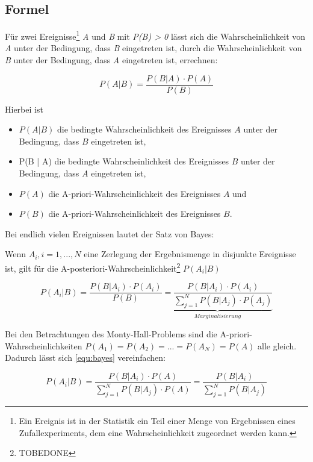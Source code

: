 \subsection{Formel}

Für zwei Ereignisse\footnote{Ein Ereignis ist in der Statistik ein Teil einer Menge von Ergebnissen eines Zufallexperiments, dem eine Wahrscheinlichkeit zugeordnet
    werden kann.} \textit{A} und \textit{B} mit \textit{P(B) > 0} lässt sich die Wahrscheinlichkeit von \textit{A} unter der Bedingung, dass \textit{B} eingetreten
ist, durch die Wahrscheinlichkeit von \textit{B} unter der Bedingung, dass \textit{A} eingetreten ist, errechnen:

\begin{equation}
    P(A | B) = \frac{P(B | A) \cdot P(A)}{P(B)}
\end{equation}

Hierbei ist

\begin{itemize}
    \item $P(A | B)$ die bedingte Wahrscheinlichkeit des Ereignisses $A$ unter der Bedingung, dass $B$ eingetreten ist,
    \item P(B | A) die bedingte Wahrscheinlichkeit des Ereignisses $B$ unter der Bedingung, dass $A$ eingetreten ist,
    \item $P(A)$ die A-priori-Wahrscheinlichkeit des Ereignisses $A$ und
    \item $P(B)$ die A-priori-Wahrscheinlichkeit des Ereignisses $B$.
\end{itemize}

Bei endlich vielen Ereignissen lautet der Satz von Bayes:

Wenn $A_i, i = 1,..., N$ eine Zerlegung der Ergebnismenge in disjunkte Ereignisse ist, gilt für die A-posteriori-Wahrscheinlichkeit\footnote{TOBEDONE}
$P(A_i | B)$

\begin{equation} \label{equ:bayes}
    P(A_i | B) = \frac{P(B | A_i) \cdot P(A_i)}{P(B)} \underbrace{= \frac{P(B | A_i) \cdot P(A_i)}{\sum_{j = 1}^{N} P(B | A_j) \cdot P(A_j)}}_{Marginalisierung}
\end{equation}

\cite[S.411f]{Papula:2014}

Bei den Betrachtungen des Monty-Hall-Problems sind die A-priori-Wahrscheinlichkeiten $P(A_1) = P(A_2) = ... = P(A_N) = P(A)$ alle gleich. Dadurch lässt sich \autoref{equ:bayes} vereinfachen:

\begin{equation} \label{equ:bayes_simpl}
    P(A_i | B)  = \frac{P(B | A_i) \cdot P(A)}{\sum_{j=1}^{N} P(B | A_j) \cdot P(A)}  = \frac{P(B|A_i)}{\sum_{j=1}^{N} P(B | A_j)}
\end{equation}
